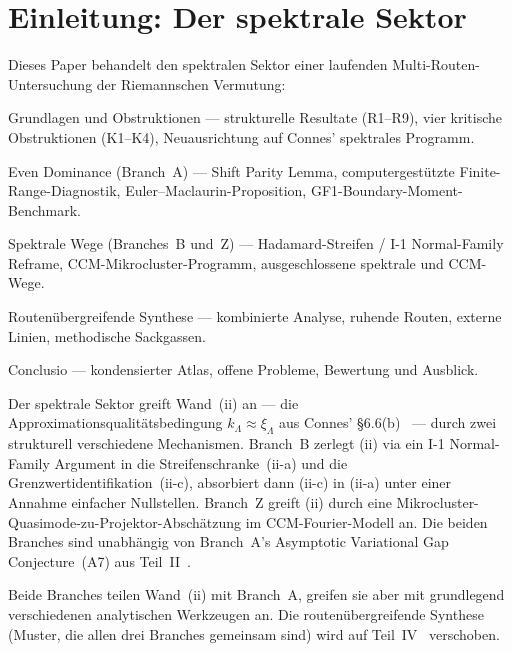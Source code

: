 \documentclass[12pt,a4paper]{article}
\theoremstyle{definition}
\theoremstyle{remark}
\begin{document}
\clearpage
\tableofcontents
\clearpage


\section{Einleitung: Der spektrale Sektor}
\label{sec:intro}

Dieses Paper behandelt den spektralen Sektor einer laufenden
Multi-Routen-Untersuchung der Riemannschen Vermutung:
\begin{description}[font=\bfseries,leftmargin=2em]
  \item[Teil~I \cite{Geiger2026partI}:] Grundlagen und Obstruktionen ---
    strukturelle Resultate (R1--R9), vier kritische Obstruktionen (K1--K4),
    Neuausrichtung auf Connes' spektrales Programm.
  \item[Teil~II \cite{Geiger2026partII}:] Even Dominance (Branch~A) ---
    Shift Parity Lemma, computergestützte Finite-Range-Diagnostik,
    Euler--Maclaurin-Proposition, GF1-Boundary-Moment-Benchmark.
  \item[Teil~III (dieses Paper):] Spektrale Wege (Branches~B und~Z) ---
    Hadamard-Streifen / I-1 Normal-Family Reframe, CCM-Mikrocluster-Programm,
    ausgeschlossene spektrale und CCM-Wege.
  \item[Teil~IV \cite{Geiger2026partIV}:] Routenübergreifende Synthese ---
    kombinierte Analyse, ruhende Routen, externe Linien, methodische
    Sackgassen.
  \item[Teil~V \cite{Geiger2026partV}:] Conclusio --- kondensierter Atlas,
    offene Probleme, Bewertung und Ausblick.
\end{description}

Der spektrale Sektor greift Wand~(ii) an --- die Approximationsqualitäts\-bedingung $k_\Lambda \approx \xi_\Lambda$ aus Connes'
\S6.6(b)~\cite{Connes2026} --- durch zwei strukturell verschiedene
Mechanismen. Branch~B zerlegt (ii) via ein I-1 Normal-Family Argument
in die Streifenschranke~(ii-a) und die Grenzwertidentifikation~(ii-c),
absorbiert dann (ii-c) in (ii-a) unter einer Annahme einfacher
Nullstellen. Branch~Z greift (ii) durch eine
Mikrocluster-Quasimode-zu-Projektor-Abschätzung im CCM-Fourier-Modell
an. Die beiden Branches sind unabhängig von Branch~A's Asymptotic
Variational Gap Conjecture~(A7) aus Teil~II~\cite{Geiger2026partII}.

Beide Branches teilen Wand~(ii) mit Branch~A, greifen sie aber mit
grundlegend verschiedenen analytischen Werkzeugen an. Die
routenübergreifende Synthese (Muster, die allen drei Branches gemeinsam
sind) wird auf Teil~IV~\cite{Geiger2026partIV} verschoben.
\end{document}
